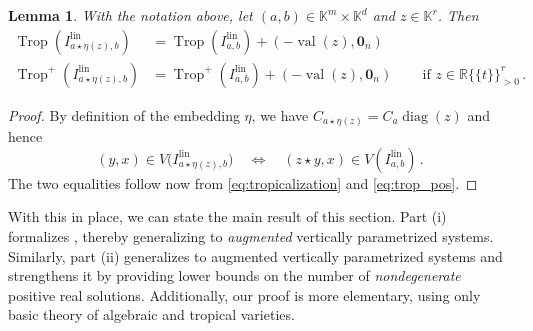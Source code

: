 \documentclass[11pt,reqno,a4paper]{amsart}
\numberwithin{equation}{section}
\theoremstyle{theoremstyle}
\newtheorem{lemma}[theorem]{Lemma}
\theoremstyle{examplestyle}
\newcommand{\lin}{{\mathrm{lin}}}
\newcommand{\RRt}{\mathbb{R}\{\!\{t\}\!\}}
\DeclareMathOperator{\diag}{diag}
\DeclareMathOperator{\Trop}{Trop}
\DeclareMathOperator{\val}{val}
\begin{document}
\begin{lemma}\label{lem:nu}
    With the notation above, let $(a,b)\in \mathbb{K}^m \times \mathbb{K}^d$ and $z\in \mathbb{K}^r$. Then
    \begin{align*}
    \Trop(I^{\lin}_{a\star \eta(z), b}) & = \Trop(I^{\lin}_{a,b}) + (-\val(z),\mathbf{0}_n)  \\ 
    \Trop^+(I^{\lin}_{a\star \eta(z), b}) & = \Trop^+(I^{\lin}_{a,b}) + (-\val(z),\mathbf{0}_n) \, \qquad  \text{if }z\in \RRt^r_{>0}\,.
    \end{align*}
\end{lemma}
\begin{proof}
By definition of the embedding $\eta$, 
we have $C_{a\star \eta(z)} =C_{a} \diag(z)$ and hence
\[ (y,x)\in V\big(I^{\lin}_{a\star \eta(z),b}\big) \quad \Leftrightarrow \quad (z \star y,x)\in V(I^{\lin}_{a,b})\,. \]
The two equalities follow now from \eqref{eq:tropicalization} and \eqref{eq:trop_pos}. 
  \end{proof}

 
With this in place, we can state the main result of this section. Part (i) formalizes \cite[Example 6.7]{HelminckRen22}, thereby generalizing \cite[Proposition 6.5]{HelminckRen22} to \emph{augmented} vertically parametrized systems. Similarly, part (ii) generalizes \cite[Theorem 6.1]{RoseTelek24} to augmented vertically parametrized systems and  strengthens it by providing lower bounds on the number of \emph{nondegenerate} positive real solutions.  Additionally, our proof is more elementary, using only basic theory of algebraic and tropical varieties.
\end{document}
